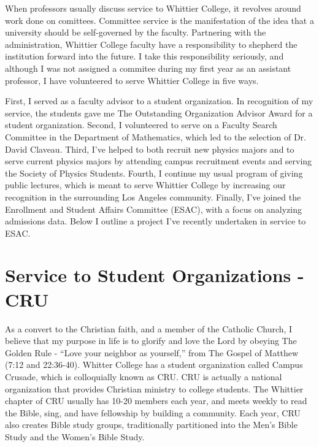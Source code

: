 \documentclass[../main.tex]{subfiles}
\begin{document}
When professors usually discuss service to Whittier College, it revolves around work done on comittees.  Committee service is the manifestation of the idea that a university should be self-governed by the faculty.  Partnering with the administration, Whittier College faculty have a responsibility to shepherd the institution forward into the future.  I take this responsibility seriously, and although I was not assigned a commitee during my first year as an assistant professor, I have volunteered to serve Whittier College in five ways. \\ \hspace{0.1cm}

First, I served as a faculty advisor to a student organization.  In recognition of my service, the students gave me The Outstanding Organization Advisor Award for a student organization.  Second, I volunteered to serve on a Faculty Search Committee in the Department of Mathematics, which led to the selection of Dr. David Claveau.  Third, I've helped to both recruit new physics majors and to serve current physics majors by attending campus recruitment events and serving the Society of Physics Students.  Fourth, I continue my usual program of giving public lectures, which is meant to serve Whittier College by increasing our recognition in the surrounding Los Angeles community.  Finally, I've joined the Enrollment and Student Affairs Committee (ESAC), with a focus on analyzing admissions data.  Below I outline a project I've recently undertaken in service to ESAC. \\ \hspace{0.1cm}

\section{Service to Student Organizations - CRU}

As a convert to the Christian faith, and a member of the Catholic Church, I believe that my purpose in life is to glorify and love the Lord by obeying The Golden Rule - ``Love your neighbor as yourself,'' from The Gospel of Matthew (7:12 and 22:36-40).  Whitter College has a student organization called Campus Crusade, which is colloquially known as CRU.  CRU is actually a national organization that provides Christian ministry to college students.  The Whittier chapter of CRU usually has 10-20 members each year, and meets weekly to read the Bible, sing, and have fellowship by building a community.  Each year, CRU also creates Bible study groups, traditionally partitioned into the Men's Bible Study and the Women's Bible Study. \\ \hspace{0.1cm}
\end{document}
